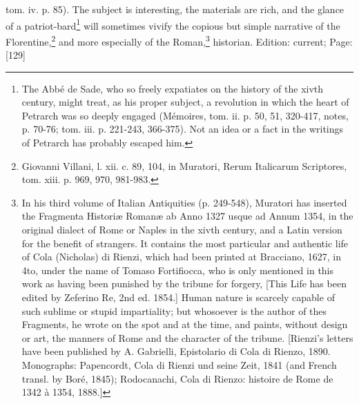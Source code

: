 {tom. iv. p. 85).} The subject is interesting, the materials are rich, and the glance of a patriot-bard\footnote{The Abbé de Sade, who so freely expatiates on the history of the xivth century, might treat, as his proper subject, a revolution in which the heart of Petrarch was so deeply engaged (Mémoires, tom. ii. p. 50, 51, 320-417, notes, p. 70-76; tom. iii. p. 221-243, 366-375). Not an idea or a fact in the writings of Petrarch has probably escaped him.} will sometimes vivify the copious but simple narrative of the Florentine,\footnote{Giovanni Villani, l. xii. c. 89, 104, in Muratori, Rerum Italicarum Scriptores, tom. xiii. p. 969, 970, 981-983.} and more especially of the Roman,\footnote{In his third volume of Italian Antiquities (p. 249-548), Muratori has inserted the Fragmenta Historiæ Romanæ ab Anno 1327 usque ad Annum 1354, in the original dialect of Rome or Naples in the xivth century, and a Latin version for the benefit of strangers. It contains the most particular and authentic life of Cola (Nicholas) di Rienzi, which had been printed at Bracciano, 1627, in 4to, under the name of Tomaso Fortifiocca, who is only mentioned in this work as having been punished by the tribune for forgery, [This Life has been edited by Zeferino Re, 2nd ed. 1854.] Human nature is scarcely capable of such sublime or stupid impartiality; but whosoever is the author of thes Fragments, he wrote on the spot and at the time, and paints, without design or art, the manners of Rome and the character of the tribune. [Rienzi\texthebrew{}’s letters have been published by A. Gabrielli, Epistolario di Cola di Rienzo, 1890. Monographs: Papencordt, Cola di Rienzi und seine Zeit, 1841 (and French transl. by Boré, 1845); Rodocanachi, Cola di Rienzo: histoire de Rome de 1342 à 1354, 1888.]} historian.
Edition: current; Page: [129]

